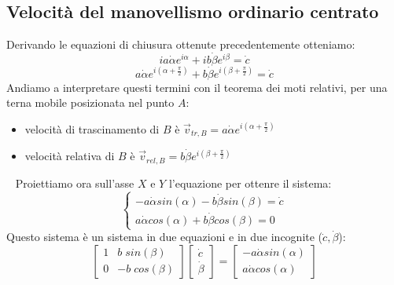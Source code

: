 \subsection{Velocità del manovellismo ordinario centrato}
Derivando le equazioni di chiusura ottenute precedentemente otteniamo:
\[
    i a \dot{\alpha} e^{i \alpha} + i b \dot{\beta} e^{i \beta} = \dot{c}
\]
\[
    a \dot{\alpha} e^{i (\alpha + \frac{\pi}{2})} + b \dot{\beta} e^{i (\beta + \frac{\pi}{2})} = \dot{c}
\]
Andiamo a interpretare questi termini con il teorema dei moti relativi, per una terna mobile posizionata nel punto $A$:
\begin{itemize}
    \item velocità di trascinamento di $B$ è $\vec{v}_{tr,B} = a \dot{\alpha} e^{i (\alpha + \frac{\pi}{2})}$
    \item velocità relativa di $B$ è $\vec{v}_{rel,B} = b \dot{\beta} e^{i (\beta + \frac{\pi}{2})}$
\end{itemize}
\ \newline
Proiettiamo ora sull'asse $X$ e $Y$ l'equazione per ottenre il sistema:
\[
    \begin{cases}
        - a \dot{\alpha} sin(\alpha) - b \dot{\beta} sin(\beta) = \dot{c}\\
        a \dot{\alpha} cos(\alpha) + b \dot{\beta} cos(\beta) = 0
    \end{cases}
\]
Questo sistema è un sistema in due equazioni e in due incognite ($\dot{c}, \dot{\beta}$):
\[
    \left[\begin{matrix}
        1 & b \; sin(\beta)\\
        0 & -b \; cos(\beta)
    \end{matrix}\right] \left[\begin{matrix}
        \dot{c} \\ \dot{\beta}
    \end{matrix}\right] = \left[\begin{matrix}
        - a \dot{\alpha} sin(\alpha) \\ a \dot{\alpha} cos(\alpha)
    \end{matrix}\right]
\]
